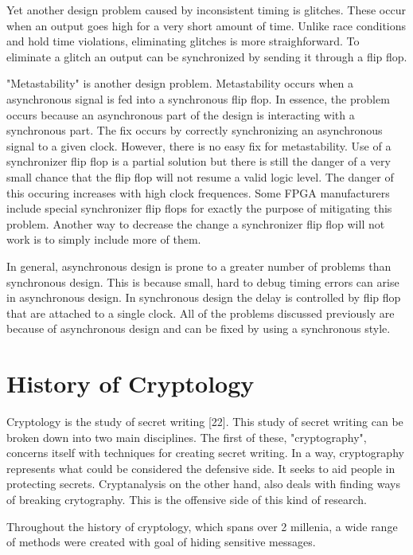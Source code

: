 \documentclass{article}
\begin{document}
    Yet another design problem caused by inconsistent timing is glitches. These occur
    when an output goes high for a very short amount of time. Unlike race conditions
    and hold time violations, eliminating glitches is more straighforward.
    To eliminate a glitch an output can be synchronized by sending it through a flip flop.

    "Metastability" is another design problem. Metastability occurs when a asynchronous
    signal is fed into a synchronous flip flop. In essence, the problem occurs because
    an asynchronous part of the design is interacting with a synchronous part.
    The fix occurs by correctly synchronizing an asynchronous signal to a given clock.
    However, there is no easy fix for metastability. Use of a synchronizer flip flop
    is a partial solution but there is still the danger of a very small chance
    that the flip flop will not resume a valid logic level. The danger of this occuring
    increases with high clock frequences. Some FPGA manufacturers include special
    synchronizer flip flops for exactly the purpose of mitigating this problem.
    Another way to decrease the change a synchronizer flip flop will not work is
    to simply include more of them.

    In general, asynchronous design is prone to a greater number of problems
    than synchronous design. This is because small, hard to debug timing errors
    can arise in asynchronous design.
    In synchronous design the delay is controlled by flip flop that are attached
    to a single clock.
    All of the problems discussed previously are because of asynchronous design
    and can be fixed by using a synchronous style.

    \section{History of Cryptology}

    Cryptology is the study of secret writing [22]. This study of secret writing
    can be broken down into two main disciplines.
    The first of these, "cryptography", concerns itself with techniques
    for creating secret writing. In a way, cryptography represents what could
    be considered the defensive side. It seeks to aid people in
    protecting secrets.
    Cryptanalysis on the other hand, also deals with finding ways of breaking
    crytography. This is the offensive side of this kind of research.

    Throughout the history of cryptology, which spans over 2 millenia,
    a wide range of methods were created with goal of hiding sensitive
    messages.
\end{document}
